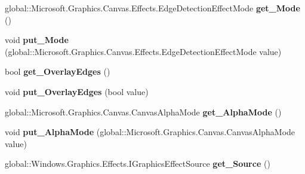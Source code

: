 \begin{DoxyCompactItemize}
global\+::\+Microsoft.\+Graphics.\+Canvas.\+Effects.\+Edge\+Detection\+Effect\+Mode {\bfseries get\+\_\+\+Mode} ()
\item 
\mbox{\label{interface_microsoft_1_1_graphics_1_1_canvas_1_1_effects_1_1_i_edge_detection_effect_ab506181e7ae373678c372e670ca4e7dc}} 
void {\bfseries put\+\_\+\+Mode} (global\+::\+Microsoft.\+Graphics.\+Canvas.\+Effects.\+Edge\+Detection\+Effect\+Mode value)
\item 
\mbox{\label{interface_microsoft_1_1_graphics_1_1_canvas_1_1_effects_1_1_i_edge_detection_effect_a3d82aa6e19802e82c6cfe865d511e72f}} 
bool {\bfseries get\+\_\+\+Overlay\+Edges} ()
\item 
\mbox{\label{interface_microsoft_1_1_graphics_1_1_canvas_1_1_effects_1_1_i_edge_detection_effect_a14bee1ac205a14649a9a545112bce70b}} 
void {\bfseries put\+\_\+\+Overlay\+Edges} (bool value)
\item 
\mbox{\label{interface_microsoft_1_1_graphics_1_1_canvas_1_1_effects_1_1_i_edge_detection_effect_a54398098083bcd5796ae07a6f2ec7377}} 
global\+::\+Microsoft.\+Graphics.\+Canvas.\+Canvas\+Alpha\+Mode {\bfseries get\+\_\+\+Alpha\+Mode} ()
\item 
\mbox{\label{interface_microsoft_1_1_graphics_1_1_canvas_1_1_effects_1_1_i_edge_detection_effect_af3adb48dad25fee5872063bee9eb520d}} 
void {\bfseries put\+\_\+\+Alpha\+Mode} (global\+::\+Microsoft.\+Graphics.\+Canvas.\+Canvas\+Alpha\+Mode value)
\item 
\mbox{\label{interface_microsoft_1_1_graphics_1_1_canvas_1_1_effects_1_1_i_edge_detection_effect_ae9990d79f4ea9a1bfe5d4eff9af1bb83}} 
global\+::\+Windows.\+Graphics.\+Effects.\+I\+Graphics\+Effect\+Source {\bfseries get\+\_\+\+Source} ()
\item 
\mbox{\label{interface_microsoft_1_1_graphics_1_1_canvas_1_1_effects_1_1_i_edge_detection_effect_ad421800073d091d86a8396aaca06ed81}} 

\end{DoxyCompactItemize}
